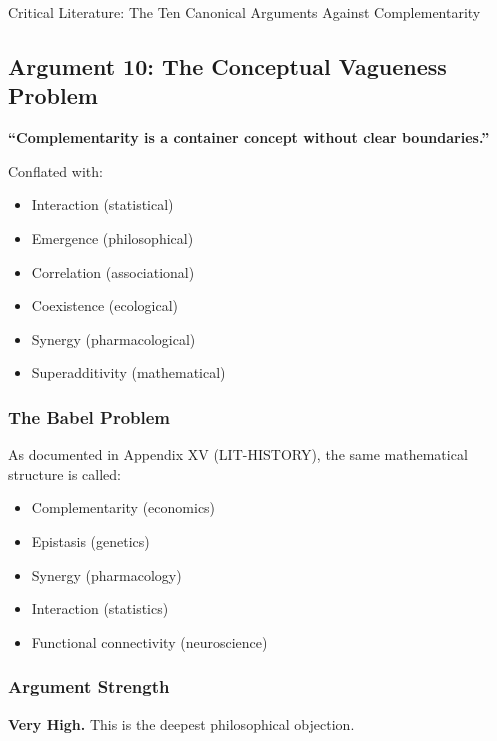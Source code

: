 \begin{chapter}{Critical Literature: The Ten Canonical Arguments Against Complementarity}
\subsection{Argument 10: The Conceptual Vagueness Problem}
\label{sec:arg-vagueness}

\begin{tcolorbox}[colback=red!5!white,colframe=red!75!black,title=\textbf{Core Claim}]
\textbf{``Complementarity is a container concept without clear boundaries.''}

Conflated with:
\begin{itemize}[noitemsep]
    \item Interaction (statistical)
    \item Emergence (philosophical)
    \item Correlation (associational)
    \item Coexistence (ecological)
    \item Synergy (pharmacological)
    \item Superadditivity (mathematical)
\end{itemize}
\end{tcolorbox}

\subsubsection{The Babel Problem}

As documented in Appendix XV (LIT-HISTORY), the same mathematical structure is called:
\begin{itemize}[noitemsep]
    \item Complementarity (economics)
    \item Epistasis (genetics)
    \item Synergy (pharmacology)
    \item Interaction (statistics)
    \item Functional connectivity (neuroscience)
\end{itemize}

\subsubsection{Argument Strength}

\textbf{Very High.} This is the deepest philosophical objection.


\end{chapter}

